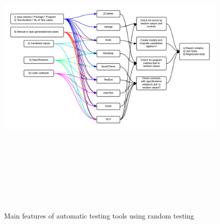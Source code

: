 

\begin{figure}
\centering
\centerline{\includegraphics[width=26cm, height=15cm]{chapter2/RandomTools01.png}}
	\caption{Main features of automatic testing tools using random testing}
	\label{fig:Tools}
\end{figure}






